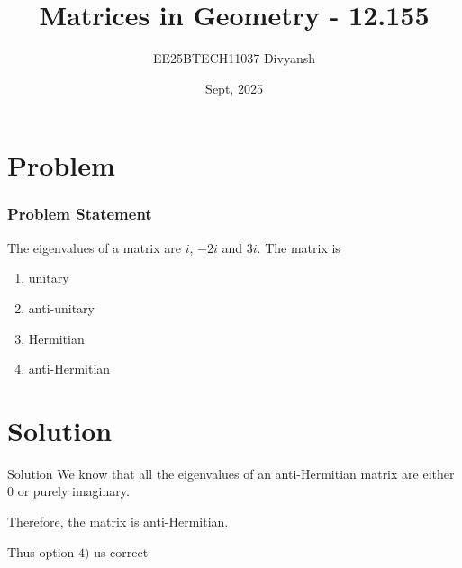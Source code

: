 \documentclass{beamer}
\title{Matrices in Geometry - 12.155}
\author{EE25BTECH11037  Divyansh}
\date{Sept, 2025}
\theoremstyle{remark}
\begin{document}
    
    \maketitle
    
    
    \section{Problem}
    \begin{frame}
    \frametitle{Problem Statement}
    The eigenvalues of a matrix are $i$, $-2i$ and $3i$. The matrix is

    \begin{enumerate}
        \item unitary
        \item anti-unitary
        \item Hermitian
        \item anti-Hermitian
    \end{enumerate}

    \end{frame}
    
    \section{Solution}
    \begin{frame}{Solution}
We know that all the eigenvalues of an anti-Hermitian matrix are either $0$ or purely imaginary.

Therefore, the matrix is anti-Hermitian.


Thus option $4)$ us correct
    \end{frame}
    
    
    
\end{document}
